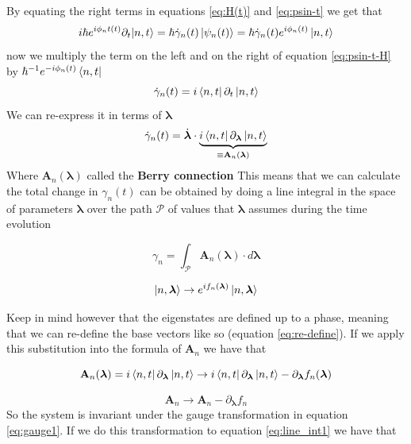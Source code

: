     By equating the right terms in equations \ref{eq:H(t)} and \ref{eq:psin-t} we get that 
    \begin{equation}
        \label{eq:psin-t-H}
            i\hbar e^{i\phi_nt(t)}\partial_t|n,t\rangle=\hbar\dot \gamma_n(t)\ket{\psi_n(t)} =\hbar\dot \gamma_n(t)e^{i\phi_n(t)}\ket{n,t}
    \end{equation}    
    now we multiply the term on the left and on the right of equation \ref{eq:psin-t-H} by $\hbar^{-1}e^{-i\phi_n(t)} \bra{n,t}$
    \begin{equation}
        \label{eq:psin-t-H-bra}
            \dot \gamma_n(t)=i\bra{n,t} \partial_t\ket{n,t}
    \end{equation}
    We can re-express it in terms of $\boldsymbol \lambda$
    \begin{equation}
        \label{eq:connection}
            \dot \gamma_n(t)=\dot{\boldsymbol \lambda}\cdot\underbrace{i\bra{n,t} \partial_{\boldsymbol \lambda}\ket{n,t}}_{\equiv \mathbf A_n(\boldsymbol \lambda)}
    \end{equation}
    Where $\mathbf A_n(\boldsymbol \lambda)$ called the \textbf{Berry connection}
    This means that we can calculate the total change in $\gamma_n(t)$ can be obtained by doing a line integral in the space of parameters $\boldsymbol \lambda$ over the path $\mathcal P$ of values that $\boldsymbol \lambda$ assumes during the time evolution

    \begin{equation}
        \label{eq:line_int1}
            \gamma_n=\int_\mathcal{P} \mathbf A_n(\boldsymbol \lambda) \cdot d\boldsymbol \lambda
    \end{equation}


    \begin{equation}
        \label{eq:re-define}
        \ket{n,\boldsymbol \lambda}\to e^{if_n(\boldsymbol \lambda)}\ket{n,\boldsymbol \lambda}
    \end{equation}

    Keep in mind however that the eigenstates are defined up to a phase, meaning that we can re-define the base vectors like so 
    (equation \ref{eq:re-define}). If we apply this substitution into the formula of $\mathbf A_n$ we have that

    \[
    \mathbf A_n(\boldsymbol \lambda) =i\bra{n,t} \partial_{\boldsymbol \lambda}\ket{n,t}\to i\bra{n,t} \partial_{\boldsymbol \lambda}\ket{n,t} - \partial_{\boldsymbol \lambda}f_n(\boldsymbol \lambda)
    \]

    \begin{equation}
        \label{eq:gauge1}
        \mathbf A_n \to \mathbf A_n - \partial_{\boldsymbol \lambda}f_n
    \end{equation}
        So the system is invariant under the gauge transformation in equation \ref{eq:gauge1}. If we do this transformation to equation \ref{eq:line_int1} we have that

